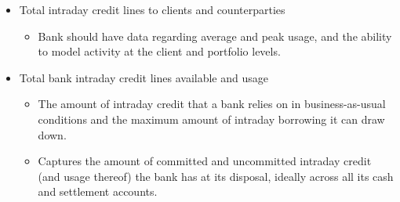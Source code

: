 \begin{itemize}
\item Total intraday credit lines to clients and counterparties
    \begin{itemize}
    \item Bank should have data regarding average and peak usage, and the ability to model activity at the client and portfolio levels.
    \end{itemize}
    
\item Total bank intraday credit lines available and usage
    \begin{itemize}
    \item The amount of intraday credit that a bank relies on in business-as-usual conditions and the maximum amount of intraday borrowing it can draw down.
    \item Captures the amount of committed and uncommitted intraday credit (and usage thereof) the bank has at its disposal, ideally across all its cash and settlement accounts.
    \end{itemize}
    
\end{itemize}



